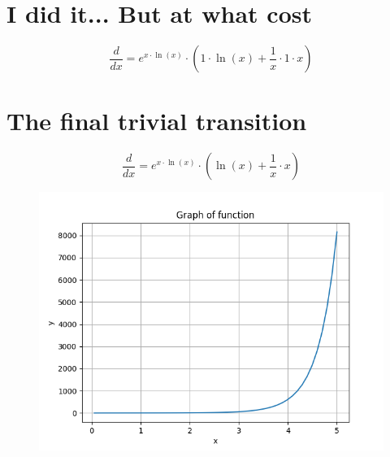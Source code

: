 \documentclass[a4paper, 12pt]{article}
\begin{document}
\section{I did it... But at what cost}\begin{equation*}
    \frac{d}{dx} = {{{e}}^{{{x}}\cdot{\ln({{x}})}}}\cdot{({{{1}}\cdot{\ln({{x}})}}+{{{\frac{{1}}{{x}}}\cdot{{1}}}\cdot{{x}}})}
\end{equation*}

\section{The final trivial transition}\begin{equation*}
    \frac{d}{dx} = {{{e}}^{{{x}}\cdot{\ln({{x}})}}}\cdot{({\ln({{x}})}+{{\frac{{1}}{{x}}}\cdot{{x}}})}
\end{equation*}

\begin{figure}[h!]
        \centering
         \includegraphics[scale=0.5]{./LaTeX/tex_pics/differ.png}
\end{figure}
\end{document}
